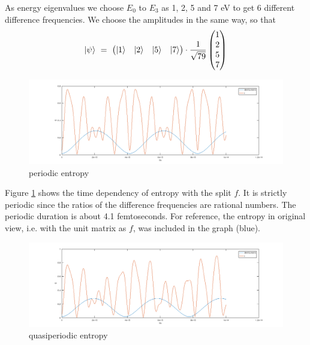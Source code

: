\documentclass[12pt]{article}
\begin{document}
As energy eigenvalues we choose $E_0$ to $E_3$ as 1, 2, 5 and 7 eV to get 6 different difference frequencies. We choose the amplitudes in the same way, so that
\begin{equation*}
\ket{\psi}\ =\ \begin{pmatrix}
\ket{1} & \ket{2} & \ket{5} & \ket{7}
\end{pmatrix}
\cdot \frac{1}{\sqrt{79}}
\begin{pmatrix}
1 \\ 2 \\ 5 \\ 7
\end{pmatrix}
\end{equation*}
\begin{figure}[!h]\begin{center}
  \includegraphics[width=19cm]{periodic_entropy.png}
  \caption{periodic entropy}
  \label{fig:periodic_entropy}
\end{center}\end{figure}

Figure \ref{fig:periodic_entropy} shows the time dependency of entropy with the split $f$. It is strictly periodic since the ratios of the difference frequencies are rational numbers. The periodic duration is about 4.1 femtoseconds.
For reference, the entropy in original view, i.e. with the unit matrix as $f$, was included in the graph (blue).
\begin{figure}[!h]\begin{center}
  \includegraphics[width=19cm]{quasi_periodic_entropy.png}
  \caption{quasiperiodic entropy}
  \label{fig:quasi_periodic_entropy}
\end{center}\end{figure}
\end{document}
